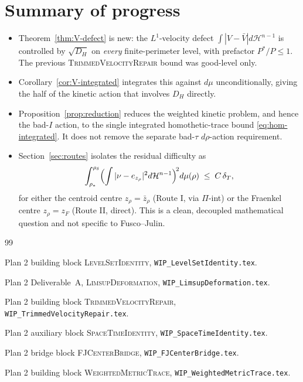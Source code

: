 \documentclass[11pt]{article}
\theoremstyle{definition}
\newcommand{\rstar}{\rho_{*}}
\newcommand{\rdel}{\rho_\delta}
\newcommand{\Hn}{\mathcal H^{n-1}}
\begin{document}
\section{Summary of progress}\label{sec:summary}

\begin{itemize}
\item Theorem~\ref{thm:V-defect} is new: the $L^{1}$-velocity defect
$\int|V-\bar V|d\Hn$ is controlled by $\sqrt{D_H}$ on \emph{every}
finite-perimeter level, with prefactor $P^{*}/P\le 1$.  The previous
\textsc{TrimmedVelocityRepair} bound was good-level only.
\item Corollary~\ref{cor:V-integrated} integrates this against
$d\mu$ unconditionally, giving the half of the kinetic action that
involves $D_H$ directly.
\item Proposition~\ref{prop:reduction} reduces the weighted kinetic
problem, and hence the bad-\(I\) action, to the single integrated
homothetic-trace bound \eqref{eq:hom-integrated}.  It does not remove
the separate bad-\(\tau\) \(d\rho\)-action requirement.
\item Section~\ref{sec:routes} isolates the residual difficulty as
\[
   \int_{\rstar}^{\rdel}\Bigl(\int|\nu-e_{z_\rho}|^{2}d\Hn\Bigr)^{\!2}d\mu(\rho)\;\le\;C\,\delta_T,
\]
for either the centroid centre $z_\rho=\bar z_\rho$ (Route I, via
$\Pi$-int) or the Fraenkel centre $z_\rho=z_F$ (Route II, direct).
This is a clean, decoupled mathematical question and not specific
to Fusco--Julin.
\end{itemize}

\begin{thebibliography}{99}

Plan 2 building block \textsc{LevelSetIdentity},
\texttt{WIP\_LevelSetIdentity.tex}.

Plan 2 Deliverable~A, \textsc{LimsupDeformation},
\texttt{WIP\_LimsupDeformation.tex}.

Plan 2 building block \textsc{TrimmedVelocityRepair},
\texttt{WIP\_TrimmedVelocityRepair.tex}.

Plan 2 auxiliary block \textsc{SpaceTimeIdentity},
\texttt{WIP\_SpaceTimeIdentity.tex}.

Plan 2 bridge block \textsc{FJCenterBridge},
\texttt{WIP\_FJCenterBridge.tex}.

Plan 2 building block \textsc{WeightedMetricTrace},
\texttt{WIP\_WeightedMetricTrace.tex}.

\end{thebibliography}
\end{document}

